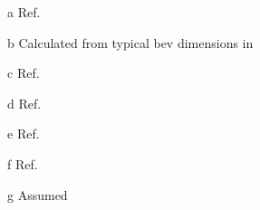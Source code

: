 \begin{table}[!htbp]
\begin{threeparttable}[t]
\begin{tabular*}{0.70\textwidth}{@{} l @{\extracolsep{\fill}}  S @{}}
			\bottomrule
		\end{tabular*}
        \begin{tablenotes}
        \item[a]Ref.~\cite{HybridCars2017Drag}
        \item[b]Calculated from typical \gls{bev} dimensions in~\cite{BoltDimensions}
        \item[c]Ref.~\cite{ETANTP002-2004}
        \item[d]Ref.~\cite{BoltOverview}
        \item[e]Ref.~\cite{Liu2016a}
        \item[f]Ref.~\cite{EmadiElectric}
        \item[g]Assumed
        \end{tablenotes}
	\end{threeparttable}
\end{table}
